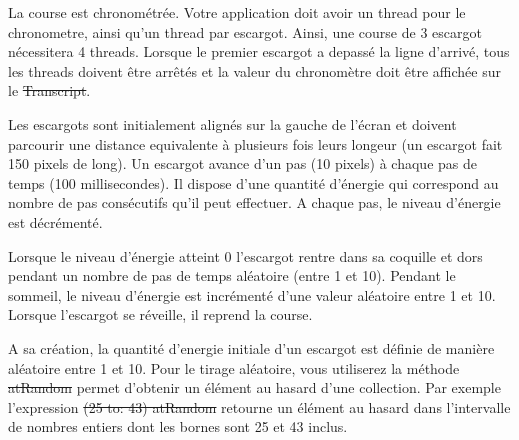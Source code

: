 \documentclass[12pt]{article}
\begin{document}
La course est chronométrée.
Votre application doit avoir un thread pour le chronometre, ainsi qu'un thread par escargot.
Ainsi, une course de 3 escargot nécessitera 4 threads.
Lorsque le premier escargot a depassé la ligne d'arrivé, tous les threads doivent être arrêtés et la valeur du chronomètre doit être affichée sur le \st{Transcript}.

Les escargots sont initialement alignés sur la gauche de l'écran et doivent parcourir une distance equivalente à plusieurs fois leurs longeur (un escargot fait 150 pixels de long).
Un escargot avance d'un pas (10 pixels) à chaque pas de temps (100 millisecondes).
Il dispose d'une quantité d'énergie qui correspond au nombre de pas consécutifs qu'il peut effectuer.
A chaque pas, le niveau d'énergie est décrémenté.

Lorsque le niveau d'énergie atteint 0 l'escargot rentre dans sa coquille et dors pendant un nombre de pas de temps aléatoire (entre 1 et 10).
Pendant le sommeil, le niveau d'énergie est incrémenté d'une valeur aléatoire entre 1 et 10.
Lorsque l'escargot se réveille, il reprend la course.

A sa création, la quantité d'energie initiale d'un escargot est définie de manière aléatoire entre 1 et 10.
Pour le tirage aléatoire, vous utiliserez la méthode \st{atRandom} permet d'obtenir un élément au hasard d'une collection.
Par exemple l'expression \st{(25 to: 43) atRandom} retourne un élément au hasard dans l'intervalle de nombres entiers dont les bornes sont 25 et 43 inclus.
\end{document}
